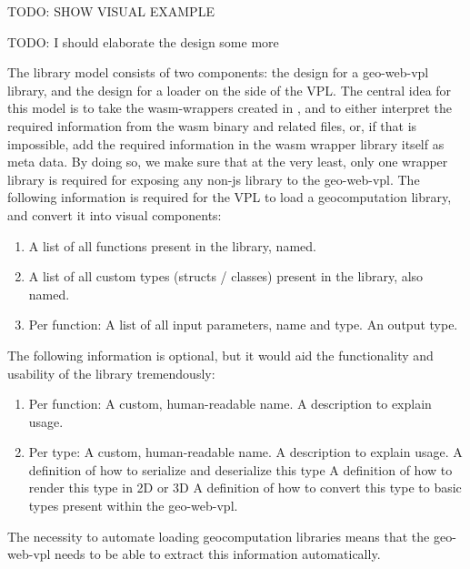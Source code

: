 \begin{note}
  TODO: SHOW VISUAL EXAMPLE
\end{note}



\begin{note}
 TODO: I should elaborate the design some more
\end{note}

The library model consists of two components: the design for a geo-web-vpl library, 
and the design for a loader on the side of the VPL. 
The central idea for this model is to take the wasm-wrappers created in , and to either interpret the required information from the wasm binary and related files, or, if that is impossible, add the required information in the wasm wrapper library itself as meta data.
By doing so, we make sure that at the very least, only one wrapper library is required for exposing any non-js library to the \ac{geo-web-vpl}.
The following information is required for the VPL to load a geocomputation library, and convert it into visual components:
\begin{enumerate}[-]
  \item A list of all functions present in the library, named.
  \item A list of all custom types (structs / classes) present in the library, also named.
  \item Per function:  
  \subitem A list of all input parameters, name and type.
  \subitem An output type.
\end{enumerate}

The following information is optional, but it would aid the functionality and usability of the library tremendously:
\begin{enumerate}[-]
  \item Per function:
  \subitem A custom, human-readable name.
  \subitem A description to explain usage.

  \item Per type:
  \subitem A custom, human-readable name.
  \subitem A description to explain usage.
  \subitem A definition of how to serialize and deserialize this type  
  \subitem A definition of how to render this type in 2D or 3D
  \subitem A definition of how to convert this type to basic types present within the geo-web-vpl.  
\end{enumerate}

The necessity to automate loading geocomputation libraries means that the \ac{geo-web-vpl} needs to be able to extract this information automatically. 




